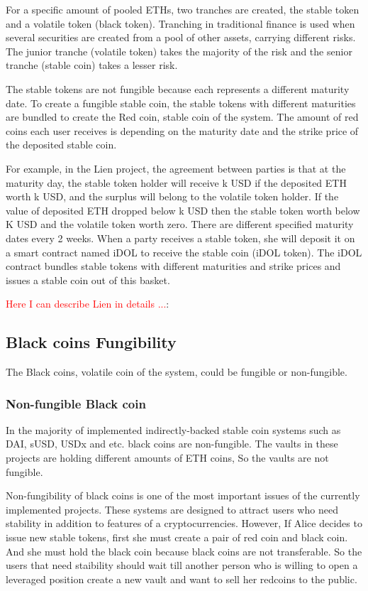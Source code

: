 For a specific amount of pooled ETHs, two tranches are created, the stable token and a volatile token (black token). Tranching in traditional finance is used when several securities are created from a pool of other assets, carrying different risks. The junior tranche (volatile token) takes the majority of the risk and the senior tranche (stable coin) takes a lesser risk.  

The stable tokens are not fungible because each represents a different maturity date.  To create a fungible stable coin, the stable tokens with different maturities are bundled to create the Red coin, stable coin of the system. The amount of red coins each user receives is depending on the maturity date and the strike price of the deposited stable coin.

For example, in the Lien project, the agreement between parties is that at the maturity day, the stable token holder will receive k USD if the deposited ETH worth k USD, and the surplus will belong to the volatile token holder. If the value of deposited ETH dropped below k USD then the stable token worth below K USD and the volatile token worth zero. There are different specified maturity dates every 2 weeks. When a party receives a stable token, she will deposit it on a smart contract named iDOL to receive the stable coin (iDOL token). The iDOL contract bundles stable tokens with different maturities and strike prices and issues a stable coin out of this basket.

\textcolor{red}{Here I can describe Lien in details ...}:


\subsection{Black coins Fungibility}

The Black coins, volatile coin of the system, could be fungible or non-fungible. 

\subsubsection{Non-fungible Black coin}

In the majority of implemented indirectly-backed stable coin systems such as DAI, sUSD, USDx and etc. black coins are non-fungible. The vaults in these projects are holding different amounts of ETH coins, So the vaults are not fungible. 

Non-fungibility of black coins is one of the most important issues of the currently implemented projects. These systems are designed to attract users who need stability in addition to features of a cryptocurrencies. However, If Alice decides to issue new stable tokens, first she must create a pair of red coin and black coin. And she must hold the black coin because black coins are not transferable. So the users that need staibility should wait till another person who is willing to open a leveraged position create a new vault and want to sell her redcoins to the public.

